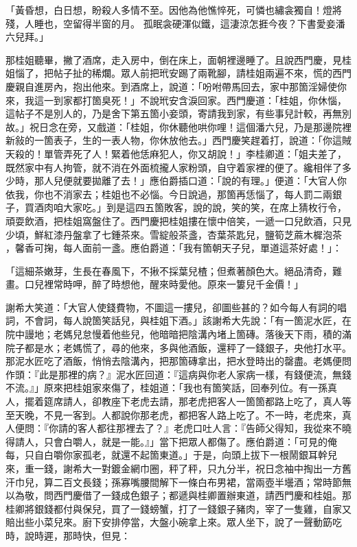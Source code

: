 \begin{showcontents}{}
「黃昏想，白日想，盼殺人多情不至。因他為他憔悴死，可憐也繡衾獨自！燈將殘，人睡也，空留得半窗的月。 孤眠衾硬渾似鐵，這淒涼怎捱今夜？下書愛妾潘六兒拜。」

那桂姐聽畢，撇了酒席，走入房中，倒在床上，面朝裡邊睡了。且說西門慶，見桂姐惱了，把帖子扯的稀爛。眾人前把玳安踢了兩靴腳，請桂姐兩遍不來，慌的西門慶親自進房內，抱出他來。到酒席上，說道：「吩咐帶馬回去，家中那箇淫婦使你來，我這一到家都打箇臭死！」不說玳安含淚回家。西門慶道：「桂姐，你休惱，這帖子不是別人的，乃是舍下第五箇小妾頭，寄請我到家，有些事兒計較，再無別故。」祝日念在旁，又戲道：「桂姐，你休聽他哄你哩！這個潘六兒，乃是那邊院裡新敍的一箇表子，生的一表人物，你休放他去。」西門慶笑趕着打，說道：「你這賊天殺的！單管弄死了人！緊着他恁麻犯人，你又胡說！」李桂卿道：「姐夫差了，既然家中有人拘管，就不消在外面梳攏人家粉頭，自守着家裡的便了。纔相伴了多少時，那人兒便就要拋離了去！」應伯爵插口道：「說的有理。」便道：「大官人你依我，你也不消家去；桂姐也不必惱。今日說過，那箇再恁惱了，每人罰二兩銀子，買酒肉咱大家吃。」到是這四五箇敗客，說的說，笑的笑，在席上猜枚行令，頑耍飲酒，把桂姐窩盤住了。西門慶把桂姐摟在懷中倍笑，一遞一口兒飲酒，只見少頃，鮮紅漆丹盤拿了七鍾茶來。雪綻般茶盞，杏葉茶匙兒，鹽筍芝蔴木樨泡茶 ，馨香可掬，每人面前一盞。應伯爵道：「我有箇朝天子兒，單道這茶好處！」：

「這細茶嫩芽，生長在春風下，不揪不採葉兒楂；但煮著顏色大。絕品清奇，難畫。口兒裡常時呷，醉了時想他，醒來時愛他。原來一簍兒千金價！」

謝希大笑道：「大官人使錢費物，不圖這一摟兒，卻圖些甚的？如今每人有詞的唱詞，不會詞，每人說箇笑話兒，與桂姐下酒。」該謝希大先說：「有一箇泥水匠，在院中謾地；老媽兒怠慢着他些兒，他暗暗把陰溝內堵上箇磚。落後天下雨，積的滿院子都是水；老媽慌了，尋的他來，多與他酒飯，還秤了一錢銀子，央他打水平。那泥水匠吃了酒飯，悄悄去陰溝內，把那箇磚拿出，把水登時出的罄盡。老媽便問作頭：『此是那裡的病？』泥水匠回道：『這病與你老人家病一樣，有錢便流，無錢不流。』」原來把桂姐家來傷了，桂姐道：「我也有箇笑話，回奉列位。有一孫真人，擺着筵席請人，卻教座下老虎去請，那老虎把客人一箇箇都路上吃了，真人等至天晚，不見一客到。人都說你那老虎，都把客人路上吃了。不一時，老虎來，真人便問：『你請的客人都往那裡去了？』老虎口吐人言：『告師父得知，我從來不曉得請人，只會白嚼人，就是一能。』」當下把眾人都傷了。應伯爵道：「可見的俺每，只自白嚼你家孤老，就還不起箇東道。」于是，向頭上拔下一根鬧銀耳幹兒來，重一錢，謝希大一對鍍金網巾圈，秤了秤，只九分半，祝日念袖中掏出一方舊汗巾兒，算二百文長錢；孫寡嘴腰間解下一條白布男裙，當兩壺半壜酒；常時節無以為敬，問西門慶借了一錢成色銀子；都遞與桂卿置辦東道，請西門慶和桂姐。那桂卿將銀錢都付與保兒，買了一錢螃蟹，打了一錢銀子豬肉，宰了一隻雞，自家又賠出些小菜兒來。廚下安排停當，大盤小碗拿上來。眾人坐下，說了一聲動筯吃時，說時遲，那時快，但見：


\end{showcontents}
